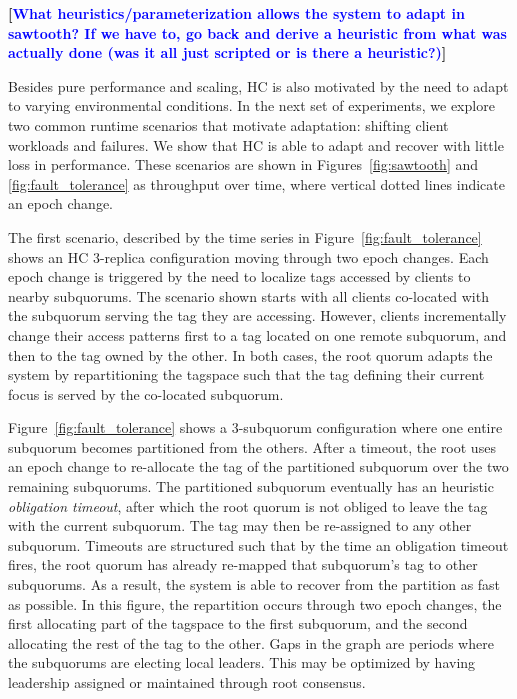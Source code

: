 \documentclass[11pt,conference]{IEEEtran}
\renewcommand{\pjk}[1]{{\bf
    [\marginpar[\hbox{{\textcolor{blue}{pjk}}\raisebox{0ex}{\Huge $\rightarrow$}}]%
{\hbox{\raisebox{0ex}{\Huge $\leftarrow$}{\textcolor{blue}{pjk}}}}\textcolor{blue}{#1}]}}
\begin{document}
          \pjk{What heuristics/parameterization allows the system to
            adapt in sawtooth? If we have to, go back and derive a
            heuristic from what was actually done (was it all just
            scripted or is there a heuristic?)}

Besides pure performance and scaling, HC is also motivated by the need to adapt to 
varying environmental conditions.
In the next set of experiments, we explore two common runtime scenarios that motivate 
adaptation: shifting client workloads and failures.
We show that HC is able to adapt and recover with little loss in performance. These 
scenarios are shown in Figures~\ref{fig:sawtooth} and 
\ref{fig:fault_tolerance} as throughput over time, where vertical dotted 
lines indicate an epoch change.

The first scenario, described by the time series in Figure~\ref{fig:fault_tolerance} 
shows an HC 3-replica configuration moving through two epoch changes.
Each epoch change is triggered by the need to localize tags accessed by
clients to nearby subquorums.
The scenario shown starts with all clients co-located with the subquorum serving the tag 
they are accessing.
However, clients incrementally change their access patterns first to a tag located on 
one remote subquorum, and then to the tag owned by the other.
In both cases, the root quorum adapts the system by repartitioning the tagspace such 
that the tag defining their current focus is served by the co-located subquorum.

Figure~\ref{fig:fault_tolerance} shows a 3-subquorum configuration where one 
entire subquorum becomes partitioned from the others.
After a timeout, the root uses an epoch change to re-allocate the tag of the partitioned 
subquorum over the two remaining subquorums.
The partitioned subquorum eventually has an heuristic \emph{obligation timeout}, after 
which the  root quorum is not obliged to leave the tag with the current subquorum.
The tag may then be re-assigned to any other subquorum.
Timeouts are structured such that by the time an obligation timeout fires, the root 
quorum has already re-mapped that subquorum's tag to other subquorums.
As a result, the system is able to recover from the partition as fast as possible.
In this figure, the repartition occurs through two epoch changes, the first allocating 
part of the tagspace to the first subquorum, and the second allocating the rest of the 
tag to the other.
Gaps in the graph are periods where the subquorums are electing local leaders.
This may be optimized by having leadership assigned or maintained through root consensus.
\end{document}
